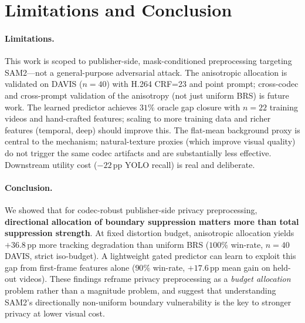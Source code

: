 \section{Limitations and Conclusion}
\label{sec:conclusion}

\paragraph{Limitations.}
This work is scoped to publisher-side, mask-conditioned preprocessing targeting SAM2---not a general-purpose adversarial attack.
The anisotropic allocation is validated on DAVIS ($n{=}40$) with H.264 CRF=23 and point prompt; cross-codec and cross-prompt validation of the anisotropy (not just uniform BRS) is future work.
The learned predictor achieves $31\%$ oracle gap closure with $n{=}22$ training videos and hand-crafted features; scaling to more training data and richer features (temporal, deep) should improve this.
The flat-mean background proxy is central to the mechanism; natural-texture proxies (which improve visual quality) do not trigger the same codec artifacts and are substantially less effective.
Downstream utility cost ($-22\,\mathrm{pp}$ YOLO recall) is real and deliberate.

\paragraph{Conclusion.}
We showed that for codec-robust publisher-side privacy preprocessing, \textbf{directional allocation of boundary suppression matters more than total suppression strength}.
At fixed distortion budget, anisotropic allocation yields $+36.8\,\mathrm{pp}$ more tracking degradation than uniform BRS ($100\%$ win-rate, $n{=}40$ DAVIS, strict iso-budget).
A lightweight gated predictor can learn to exploit this gap from first-frame features alone ($90\%$ win-rate, $+17.6\,\mathrm{pp}$ mean gain on held-out videos).
These findings reframe privacy preprocessing as a \emph{budget allocation} problem rather than a magnitude problem, and suggest that understanding SAM2's directionally non-uniform boundary vulnerability is the key to stronger privacy at lower visual cost.

